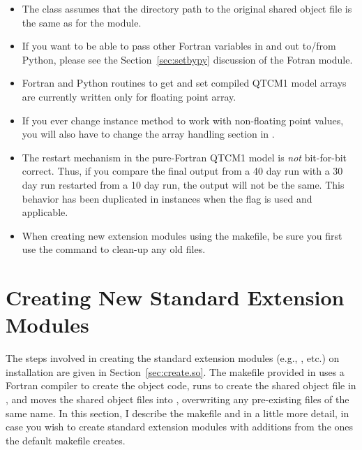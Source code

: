 \begin{itemize}
\item The  class assumes that the directory path 
	to the original shared object file is the same as for the 
	 module.

\item If you want to be able to pass other Fortran variables 
	in and out to/from Python, please see the 
	Section~\ref{sec:setbypy}
	discussion of the Fotran  module.

\item Fortran and Python routines to get and set compiled QTCM1 model
	arrays are currently written only for floating point array.

\item If you ever change 
	 instance method
	to work with non-floating point values, you will also
	have to change the array handling section in 
	.

\item The restart mechanism in the pure-Fortran QTCM1 model is 
	\emph{not} bit-for-bit correct.  Thus, if you compare the final
	output from a 40 day run with a 30 day run restarted from
	a 10 day run, the output will not be the same.
	This behavior has been duplicated in  
	instances when the  flag is used
	and applicable.

\item When creating new extension modules using the  makefile,
	be sure you first use the  command to clean-up
	any old files.

\end{itemize}




\section{Creating New Standard Extension Modules}   \label{sec:create.new.so}

The steps involved in creating the standard extension modules (e.g.,
, etc.) on installation are given in
Section~\ref{sec:create.so}.  The makefile provided in 
uses a Fortran compiler to create the object code, runs 
to create the shared object file in , and moves the shared
object files into , overwriting any pre-existing files
of the same name.  In this section, I describe the makefile and
 in a little more detail, in case you wish to create
standard extension modules with additions from the ones the default
makefile creates.


